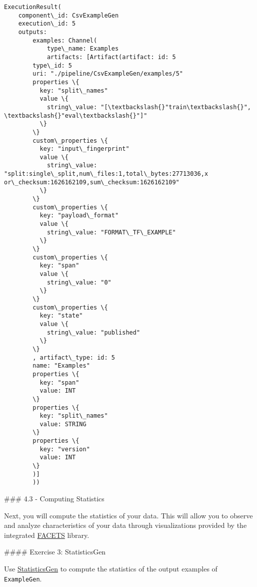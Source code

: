 \documentclass[11pt]{article}
\makeatletter
\newcommand{\boxspacing}{\kern\kvtcb@left@rule\kern\kvtcb@boxsep}
\newcommand{\prompt}[4]{
        {\ttfamily\llap{{\color{#2}[#3]:\hspace{3pt}#4}}\vspace{-\baselineskip}}
    }
\makeatother
\begin{document}
            \begin{tcolorbox}[breakable, size=fbox, boxrule=.5pt, pad at break*=1mm, opacityfill=0]
\prompt{Out}{outcolor}{15}{\boxspacing}
\begin{Verbatim}[commandchars=\\\{\}]
ExecutionResult(
    component\_id: CsvExampleGen
    execution\_id: 5
    outputs:
        examples: Channel(
            type\_name: Examples
            artifacts: [Artifact(artifact: id: 5
        type\_id: 5
        uri: "./pipeline/CsvExampleGen/examples/5"
        properties \{
          key: "split\_names"
          value \{
            string\_value: "[\textbackslash{}"train\textbackslash{}", \textbackslash{}"eval\textbackslash{}"]"
          \}
        \}
        custom\_properties \{
          key: "input\_fingerprint"
          value \{
            string\_value: "split:single\_split,num\_files:1,total\_bytes:27713036,x
or\_checksum:1626162109,sum\_checksum:1626162109"
          \}
        \}
        custom\_properties \{
          key: "payload\_format"
          value \{
            string\_value: "FORMAT\_TF\_EXAMPLE"
          \}
        \}
        custom\_properties \{
          key: "span"
          value \{
            string\_value: "0"
          \}
        \}
        custom\_properties \{
          key: "state"
          value \{
            string\_value: "published"
          \}
        \}
        , artifact\_type: id: 5
        name: "Examples"
        properties \{
          key: "span"
          value: INT
        \}
        properties \{
          key: "split\_names"
          value: STRING
        \}
        properties \{
          key: "version"
          value: INT
        \}
        )]
        ))
\end{Verbatim}
\end{tcolorbox}
        
    \#\#\# 4.3 - Computing Statistics

Next, you will compute the statistics of your data. This will allow you
to observe and analyze characteristics of your data through
visualizations provided by the integrated
\href{https://pair-code.github.io/facets/}{FACETS} library.

    \#\#\#\# Exercise 3: StatisticsGen

Use \href{https://www.tensorflow.org/tfx/guide/statsgen}{StatisticsGen}
to compute the statistics of the output examples of \texttt{ExampleGen}.
\end{document}

